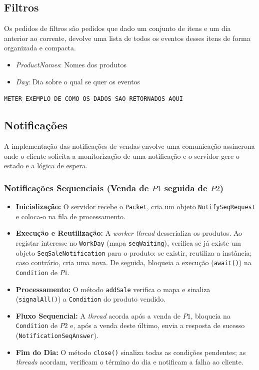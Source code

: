 \documentclass[runningheads]{llncs}
\begin{document}
\subsection{Filtros}
Os pedidos de filtros são pedidos que dado um conjunto de itens e um dia anterior ao corrente, devolve uma lista de todos os eventos desses itens de forma organizada e compacta.
\begin{itemize}
  \item \emph{ProductNames}: Nomes dos produtos
  \item \emph{Day}: Dia sobre o qual se quer os eventos
\end{itemize}

\texttt{METER EXEMPLO DE COMO OS DADOS SAO RETORNADOS AQUI}

\subsection{Notificações}
A implementação das notificações de vendas envolve uma comunicação assíncrona onde o cliente solicita a monitorização de uma notificação e o servidor gere o estado e a lógica de espera.

\subsubsection{Notificações Sequenciais (Venda de $P1$ seguida de $P2$)}

\begin{itemize}
    \item \textbf{Inicialização:} O servidor recebe o \texttt{Packet}, cria um objeto \texttt{NotifySeqRequest} e coloca-o na fila de processamento.
    
    \item \textbf{Execução e Reutilização:} A \textit{worker thread} desserializa os produtos. Ao registar interesse no \texttt{WorkDay} (mapa \texttt{seqWaiting}), verifica se já existe um objeto \texttt{SeqSaleNotification} para o produto: se existir, reutiliza a instância; caso contrário, cria uma nova. De seguida, bloqueia a execução (\texttt{await()}) na \texttt{Condition} de $P1$.
    
    \item \textbf{Processamento:} O método \texttt{addSale} verifica o mapa e sinaliza (\texttt{signalAll()}) a \texttt{Condition} do produto vendido.
    
    \item \textbf{Fluxo Sequencial:} A \textit{thread} acorda após a venda de $P1$, bloqueia na \texttt{Condition} de $P2$ e, após a venda deste último, envia a resposta de sucesso (\texttt{NotificationSeqAnswer}).
    
    \item \textbf{Fim do Dia:} O método \texttt{close()} sinaliza todas as condições pendentes; as \textit{threads} acordam, verificam o término do dia e notificam a falha ao cliente.
\end{itemize}
\end{document}
